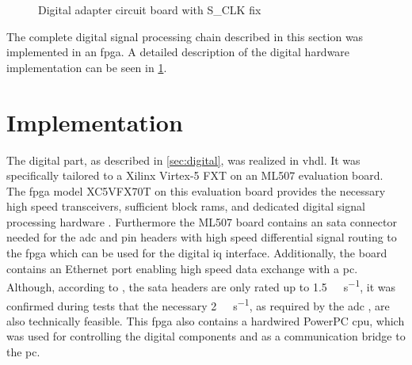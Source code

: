 \documentclass[12pt,a4paper,parskip=full,abstract=true,BCOR=12mm]{scrreprt}
\begin{document}
\begin{figure}[htb]
    \centering
    \caption{Digital  adapter circuit board with S\_CLK fix}
    \label{fig:iq_adapter_circ}
\end{figure}

The complete digital signal processing chain described in this section was implemented
in an \gls{fpga}. A detailed description of the digital hardware implementation can
be seen in \cref{chap:fpga}.


\chapter{ Implementation}
\label{chap:fpga}

The digital part, as described in \cref{sec:digital}, was realized in \gls{vhdl}.
It was specifically tailored to a Xilinx \mbox{Virtex-5} FXT on an ML507 evaluation board.
The \gls{fpga} model XC5VFX70T on this evaluation board provides the necessary
high speed transceivers, sufficient block \glspl{ram}, and dedicated digital
signal processing hardware \cite{virtex5ds}. Furthermore the ML507 board contains
an \gls{sata} connector needed for the \gls{adc} and pin headers with high speed differential signal routing to the \gls{fpga}
which can be used for the digital \gls{iq} interface. Additionally, the board contains an
Ethernet port enabling high speed data exchange with a \gls{pc}. Although, according to
\cite{ml507}, the \gls{sata} headers are only rated up to \SI{1.5}{\giga\bit\per\second},
it was confirmed during tests that the necessary \SI{2}{\giga\bit\per\second}, as required
by the \gls{adc} \cite{ltc2274}, are also technically feasible. This \gls{fpga} also contains a
hardwired PowerPC \gls{cpu}, which was used for controlling the digital components
and as a communication bridge to the \gls{pc}.
\end{document}
